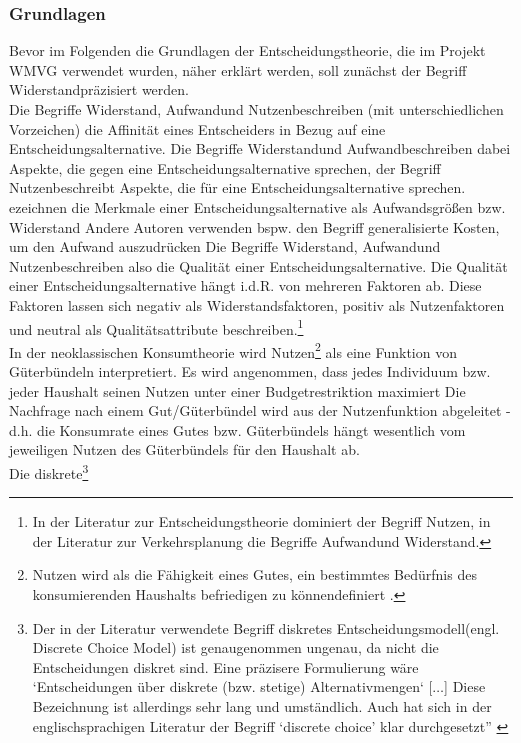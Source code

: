 \subsubsection{Grundlagen}
\label{_Ref364763140}
\label{_Toc366766078}
\label{_Toc366775272}
Bevor im Folgenden die Grundlagen der Entscheidungstheorie, die im Projekt WMVG verwendet wurden, näher erklärt werden, soll zunächst der Begriff \glqq Widerstand\grqq  präzisiert werden.~\\
Die Begriffe \glqq Widerstand\grqq , \glqq Aufwand\grqq  und \glqq Nutzen\grqq  beschreiben (mit unterschiedlichen Vorzeichen) die Affinität eines Entscheiders in Bezug auf eine Entscheidungsalternative. Die Begriffe \glqq Widerstand\grqq  und \glqq Aufwand\grqq  beschreiben dabei Aspekte, die gegen eine Entscheidungsalternative sprechen, der Begriff \glqq Nutzen\grqq  beschreibt Aspekte, die für eine Entscheidungsalternative sprechen.  \citeauthor{bib.213} ezeichnen die Merkmale einer Entscheidungsalternative als Aufwandsgrößen bzw. Widerstand  \autocites[][]{bib.213} Andere Autoren verwenden bspw. den Begriff \glqq generalisierte Kosten\grqq , um den Aufwand auszudrücken  \autocites[][]{bib.496} \autocites[][]{bib.268} Die Begriffe  \glqq Widerstand\grqq , \glqq Aufwand\grqq  und \glqq Nutzen\grqq  beschreiben also die Qualität einer Entscheidungsalternative. Die Qualität einer Entscheidungsalternative hängt i.d.R. von mehreren Faktoren ab. Diese Faktoren lassen sich negativ als Widerstandsfaktoren, positiv als Nutzenfaktoren und neutral als Qualitätsattribute beschreiben.\footnote{%
 In der Literatur zur Entscheidungstheorie dominiert der Begriff \glqq Nutzen\grqq , in der Literatur zur Verkehrsplanung die Begriffe \glqq Aufwand\grqq  und \glqq Widerstand\grqq .
}%
~\\
In der neoklassischen Konsumtheorie wird Nutzen\footnote{%
 Nutzen wird als die \glqq Fähigkeit eines Gutes, ein bestimmtes Bedürfnis des konsumierenden Haushalts befriedigen zu können\grqq  definiert  .
}%
 als eine Funktion von Güterbündeln interpretiert. Es wird angenommen, dass jedes Individuum bzw. jeder Haushalt seinen Nutzen unter einer Budgetrestriktion maximiert  \autocites[][]{bib.103} Die Nachfrage nach einem Gut/Güterbündel wird aus der Nutzenfunktion abgeleitet - d.h. die Konsumrate eines Gutes bzw. Güterbündels hängt wesentlich vom jeweiligen Nutzen des Güterbündels für den Haushalt ab.~\\
Die diskrete\footnote{%
 Der in der Literatur verwendete Begriff \glqq diskretes Entscheidungsmodell\grqq  (engl. \glqq Discrete Choice Model\grqq ) ist genaugenommen ungenau, da nicht die Entscheidungen diskret sind. Eine präzisere Formulierung wäre \glqq ‘Entscheidungen über diskrete (bzw. stetige) Alternativmengen‘ [$\ldots$] Diese Bezeichnung ist allerdings sehr lang und umständlich. Auch hat sich in der englischsprachigen Literatur der Begriff ‘discrete choice’ klar durchgesetzt”  \autocites[][]{bib.103}
}%

